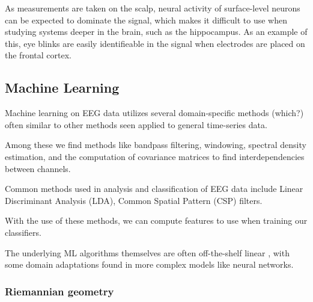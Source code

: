 \documentclass[a4paper]{article}
\begin{document}
\begin{refsection}

        As measurements are taken on the scalp, neural activity of surface-level neurons can be expected to dominate the signal, which makes it difficult to use when studying systems deeper in the brain, such as the hippocampus. As an example of this, eye blinks are easily identifieable in the signal when electrodes are placed on the frontal cortex.



    \subsection{Machine Learning}

        Machine learning on EEG data utilizes several domain-specific methods (which?) often similar to other methods seen applied to general time-series data.

        Among these we find methods like bandpass filtering, windowing, spectral density estimation, and the computation of covariance matrices to find interdependencies between channels.

        Common methods used in analysis and classification of EEG data include Linear Discriminant Analysis (LDA), Common Spatial Pattern (CSP) filters.

        With the use of these methods, we can compute features to use when training our classifiers.

        The underlying ML algorithms themselves are often off-the-shelf linear , with some domain adaptations found in more complex models like neural networks.


        \subsubsection{Riemannian geometry}



\end{refsection}
\end{document}
